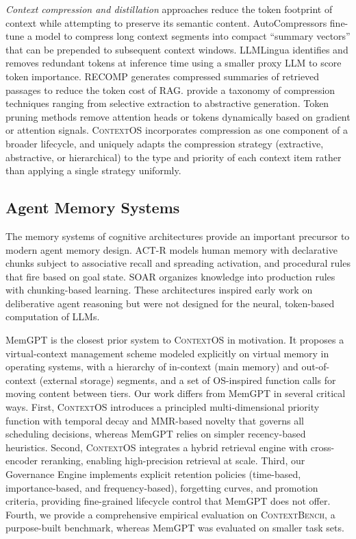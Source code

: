 \documentclass[review,12pt]{elsarticle}
\newcommand{\contextos}{\textsc{ContextOS}}
\newcommand{\contextbench}{\textsc{ContextBench}}
\begin{document}
\textit{Context compression and distillation} approaches reduce the token
footprint of context while attempting to preserve its semantic content.
AutoCompressors \citep{chevalier2023autocompressors} fine-tune a model to
compress long context segments into compact ``summary vectors'' that can be
prepended to subsequent context windows.  LLMLingua \citep{jiang2023llmlingua}
identifies and removes redundant tokens at inference time using a smaller proxy
LLM to score token importance.  RECOMP \citep{xu2023recomp} generates
compressed summaries of retrieved passages to reduce the token cost of RAG.
\citet{ge2023context} provide a taxonomy of compression techniques ranging from
selective extraction to abstractive generation.  Token pruning methods
\citep{ye2024differential,kim2022learned} remove attention heads or tokens
dynamically based on gradient or attention signals.  \contextos{} incorporates
compression as one component of a broader lifecycle, and uniquely adapts the
compression strategy (extractive, abstractive, or hierarchical) to the type and
priority of each context item rather than applying a single strategy uniformly.

\subsection{Agent Memory Systems}
\label{subsec:agent-memory}

The memory systems of cognitive architectures provide an important precursor to
modern agent memory design.  ACT-R \citep{anderson2004actr} models human memory
with declarative chunks subject to associative recall and spreading activation,
and procedural rules that fire based on goal state.  SOAR \citep{laird2012soar}
organizes knowledge into production rules with chunking-based learning.  These
architectures inspired early work on deliberative agent reasoning but were not
designed for the neural, token-based computation of LLMs.

MemGPT \citep{packer2023memgpt} is the closest prior system to \contextos{}
in motivation.  It proposes a virtual-context management scheme modeled
explicitly on virtual memory in operating systems, with a hierarchy of in-context
(main memory) and out-of-context (external storage) segments, and a set of
OS-inspired function calls for moving content between tiers.  Our work differs
from MemGPT in several critical ways.  First, \contextos{} introduces a
principled multi-dimensional priority function with temporal decay and MMR-based
novelty that governs all scheduling decisions, whereas MemGPT relies on simpler
recency-based heuristics.  Second, \contextos{} integrates a hybrid retrieval
engine with cross-encoder reranking, enabling high-precision retrieval at scale.
Third, our Governance Engine implements explicit retention policies (time-based,
importance-based, and frequency-based), forgetting curves, and promotion
criteria, providing fine-grained lifecycle control that MemGPT does not offer.
Fourth, we provide a comprehensive empirical evaluation on \contextbench{}, a
purpose-built benchmark, whereas MemGPT was evaluated on smaller task sets.
\end{document}
